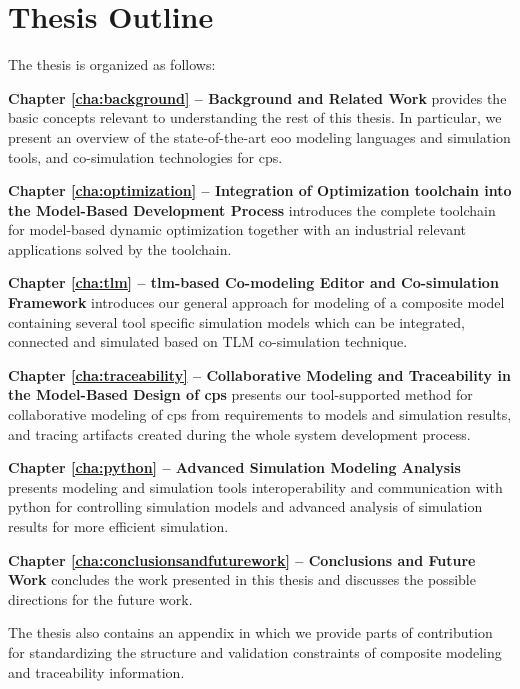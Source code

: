 \section{Thesis Outline}
\label{sec:Thesis Outline}

The thesis is organized as follows:

\begin{description}
	
\item \textbf{Chapter \ref{cha:background} – Background and Related Work } provides the basic concepts relevant to understanding the rest of this thesis.  In particular, we present an overview of the state-of-the-art \acrshort{eoo} modeling languages and simulation tools, and co-simulation technologies for \acrshort{cps}. 

\item \textbf{Chapter \ref{cha:optimization} – Integration of Optimization toolchain into the Model-Based Development Process} introduces the complete toolchain for model-based dynamic optimization together with an industrial relevant applications solved by the toolchain.

\item \textbf{Chapter \ref{cha:tlm} – \acrshort{tlm}-based Co-modeling Editor and Co-simulation Framework} introduces our general approach for modeling of a composite model containing several tool specific simulation models which can be integrated, connected and simulated based on TLM co-simulation technique.

\item \textbf{Chapter \ref{cha:traceability} – Collaborative Modeling and Traceability in the Model-Based Design of \acrshort{cps}} presents our tool-supported method for collaborative modeling of \acrshort{cps} from requirements to models and simulation results, and tracing artifacts created during the whole system development process.  

\item \textbf{Chapter \ref{cha:python} – Advanced Simulation Modeling Analysis} presents modeling and simulation tools interoperability and communication with python for controlling simulation models and advanced analysis of simulation results for more efficient simulation.

\item \textbf{Chapter \ref{cha:conclusionsandfuturework} – Conclusions and Future Work} concludes the work presented in this thesis and discusses the possible directions for the future work.

\end{description}

The thesis also contains an appendix in which we provide parts of contribution for standardizing the structure and validation constraints of composite modeling and traceability information.




